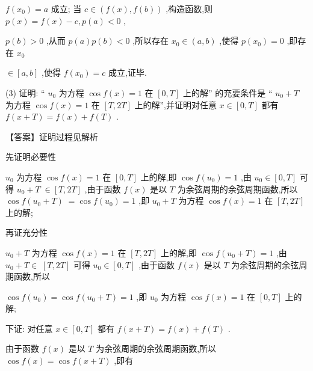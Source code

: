\documentclass[10pt]{article}
\begin{document}
\(f\left( {x}_{0}\right)  = a\) 成立; 当 \(c \in  \left( {f\left( x\right) ,f\left( b\right) }\right)\) ,构造函数,则 \(p\left( x\right)  = f\left( x\right)  - c,p\left( a\right)  < 0\) ,

\(p\left( b\right)  > 0\) ,从而 \(p\left( a\right) p\left( b\right)  < 0\) ,所以存在 \({x}_{0} \in  \left( {a,b}\right)\) ,使得 \(p\left( {x}_{0}\right)  = 0\) ,即存在 \({x}_{0}\)

\(\in  \left\lbrack  {a,b}\right\rbrack\) ,使得 \(f\left( {x}_{0}\right)  = c\) 成立,证毕.

(3) 证明: “ \({u}_{0}\) 为方程 \(\cos f\left( x\right)  = 1\) 在 \(\left\lbrack  {0,T}\right\rbrack\) 上的解” 的充要条件是 “ \({u}_{0} + T\) 为方程 \(\cos f\left( x\right)  = 1\) 在 \(\left\lbrack  {T,{2T}}\right\rbrack\) 上的解”,并证明对任意 \(x \in  \left\lbrack  {0,T}\right\rbrack\) 都有 \(f\left( {x + T}\right)  = f\left( x\right)  + f\left( T\right)\) .

【答案】证明过程见解析

先证明必要性

\({u}_{0}\) 为方程 \(\cos f\left( x\right)  = 1\) 在 \(\left\lbrack  {0,T}\right\rbrack\) 上的解,即 \(\cos f\left( {u}_{0}\right)  = 1\) ,由 \({u}_{0} \in  \left\lbrack  {0,T}\right\rbrack\) 可得 \({u}_{0} + T \; \in  \left\lbrack  {T,{2T}}\right\rbrack\) ,由于函数 \(f\left( x\right)\) 是以 \(T\) 为余弦周期的余弦周期函数,所以 \(\cos f\left( {{u}_{0} + T}\right) \; = \cos f\left( {u}_{0}\right)  = 1\) ,即 \({u}_{0} + T\) 为方程 \(\cos f\left( x\right)  = 1\) 在 \(\left\lbrack  {T,{2T}}\right\rbrack\) 上的解;

再证充分性

\({u}_{0} + T\) 为方程 \(\cos f\left( x\right)  = 1\) 在 \(\left\lbrack  {T,{2T}}\right\rbrack\) 上的解,即 \(\cos f\left( {{u}_{0} + T}\right)  = 1\) ,由 \({u}_{0} + T \in \; \left\lbrack  {T,{2T}}\right\rbrack\) 可得 \({u}_{0} \in  \left\lbrack  {0,T}\right\rbrack\) ,由于函数 \(f\left( x\right)\) 是以 \(T\) 为余弦周期的余弦周期函数,所以

\(\cos f\left( {u}_{0}\right)  = \cos f\left( {{u}_{0} + T}\right)  = 1\) ,即 \({u}_{0}\) 为方程 \(\cos f\left( x\right)  = 1\) 在 \(\left\lbrack  {0,T}\right\rbrack\) 上的解;

下证: 对任意 \(x \in  \left\lbrack  {0,T}\right\rbrack\) 都有 \(f\left( {x + T}\right)  = f\left( x\right)  + f\left( T\right)\) .

由于函数 \(f\left( x\right)\) 是以 \(T\) 为余弦周期的余弦周期函数,所以 \(\cos f\left( x\right)  = \cos f\left( {x + T}\right)\) ,即有
\end{document}
